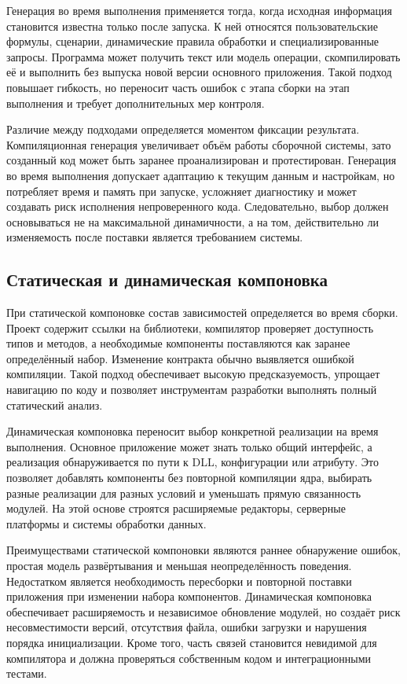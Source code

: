 Генерация во время выполнения применяется тогда, когда исходная информация становится известна только после запуска. К ней относятся пользовательские формулы, сценарии, динамические правила обработки и специализированные запросы. Программа может получить текст или модель операции, скомпилировать её и выполнить без выпуска новой версии основного приложения. Такой подход повышает гибкость, но переносит часть ошибок с этапа сборки на этап выполнения и требует дополнительных мер контроля.

Различие между подходами определяется моментом фиксации результата. Компиляционная генерация увеличивает объём работы сборочной системы, зато созданный код может быть заранее проанализирован и протестирован. Генерация во время выполнения допускает адаптацию к текущим данным и настройкам, но потребляет время и память при запуске, усложняет диагностику и может создавать риск исполнения непроверенного кода. Следовательно, выбор должен основываться не на максимальной динамичности, а на том, действительно ли изменяемость после поставки является требованием системы.

\subsection{Статическая и динамическая компоновка}

При статической компоновке состав зависимостей определяется во время сборки. Проект содержит ссылки на библиотеки, компилятор проверяет доступность типов и методов, а необходимые компоненты поставляются как заранее определённый набор. Изменение контракта обычно выявляется ошибкой компиляции. Такой подход обеспечивает высокую предсказуемость, упрощает навигацию по коду и позволяет инструментам разработки выполнять полный статический анализ.

Динамическая компоновка переносит выбор конкретной реализации на время выполнения. Основное приложение может знать только общий интерфейс, а реализация обнаруживается по пути к DLL, конфигурации или атрибуту. Это позволяет добавлять компоненты без повторной компиляции ядра, выбирать разные реализации для разных условий и уменьшать прямую связанность модулей. На этой основе строятся расширяемые редакторы, серверные платформы и системы обработки данных.

Преимуществами статической компоновки являются раннее обнаружение ошибок, простая модель развёртывания и меньшая неопределённость поведения. Недостатком является необходимость пересборки и повторной поставки приложения при изменении набора компонентов. Динамическая компоновка обеспечивает расширяемость и независимое обновление модулей, но создаёт риск несовместимости версий, отсутствия файла, ошибки загрузки и нарушения порядка инициализации. Кроме того, часть связей становится невидимой для компилятора и должна проверяться собственным кодом и интеграционными тестами.

